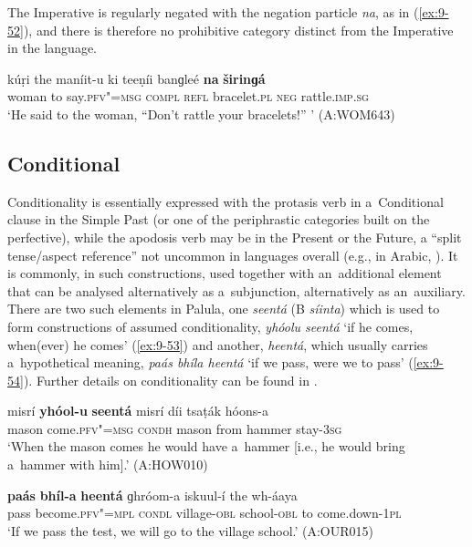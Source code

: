 The Imperative is regularly negated with the negation particle \textit{na}, as in (\ref{ex:9-52}), and there is therefore no prohibitive category distinct from the Imperative in the language.

\begin{exe}
\ex
\label{ex:9-52}
\gll kúṛi the maníit-u ki teeṇíi banɡleé \textbf{na} \textbf{širinɡá} \\
woman to say.\textsc{pfv"=msg} \textsc{compl} \textsc{refl} bracelet.\textsc{pl} \textsc{neg} rattle.\textsc{imp.sg} \\
\glt `He said to the woman, ``Don't rattle your bracelets!'' ' (A:WOM643)
\end{exe}

\subsection{Conditional}
\label{subsec:9-2-2}

Conditionality is essentially expressed with the protasis verb in a~Conditional clause in the Simple Past (or one of the periphrastic categories built on the perfective), while the apodosis verb may be in the Present or the Future, a ``split tense/aspect reference'' not uncommon in languages overall (e.g., in Arabic, \citealt[80]{dahl1985}). It is commonly, in such constructions, used together with an~additional element that can be analysed alternatively as a~subjunction, alternatively as an~auxiliary. There are two such elements in Palula, one \textit{seentá} (B \textit{síinta}) which is used to form constructions of assumed conditionality, \textit{yhóolu seentá} `if he comes, when(ever) he comes' (\ref{ex:9-53}) and another, \textit{heentá}, which usually carries a~hypothetical meaning, \textit{paás bhíla heentá} `if we pass, were we to pass' (\ref{ex:9-54}). Further details on conditionality can be found in . 

\begin{exe}
\ex
\label{ex:9-53}
\gll misrí \textbf{yhóol-u} \textbf{seentá} misrí díi tsaṭák hóons-a \\
mason come.\textsc{pfv"=msg} \textsc{condh} mason from hammer stay-\textsc{3sg} \\
\glt `When the mason comes he would have a~hammer [i.e., he would bring a~hammer with him].' (A:HOW010)

\ex
\label{ex:9-54}
\gll \textbf{paás} \textbf{bhíl-a} \textbf{heentá}  ɡhróom-a iskuul-í the wh-áaya\\
pass become.\textsc{pfv"=mpl} \textsc{condl}  village-\textsc{obl} school-\textsc{obl} to come.down-\textsc{1pl}\\
\glt `If we pass the test, we will go to the village school.' (A:OUR015)
\end{exe}

